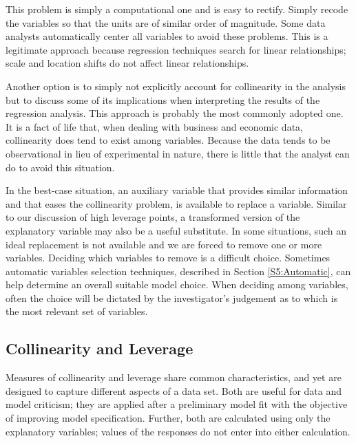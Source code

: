 This problem is simply a computational one and is easy to rectify. Simply
recode the variables so that the units are of similar order of magnitude.
Some data analysts automatically center all variables to avoid these
problems. This is a legitimate approach because regression techniques search
for linear relationships; scale and location shifts do not affect linear
relationships.

Another option is to simply not explicitly account for collinearity in the
analysis but to discuss some of its implications when interpreting the
results of the regression analysis. This approach is probably the most
commonly adopted one. It is a fact of life that, when dealing with business
and economic data, collinearity does tend to exist among variables. Because
the data tends to be observational in lieu of experimental in nature, there
is little that the analyst can do to avoid this situation.


In the best-case situation, an auxiliary variable that provides
similar information and that eases the collinearity problem, is
available to replace a variable. Similar to our discussion of high
leverage points, a transformed version of the explanatory variable
may also be a useful substitute. In some situations, such an ideal
replacement is not available and we are forced to remove one or more
variables. Deciding which variables to remove is a difficult choice.
Sometimes automatic variables selection techniques, described in
Section \ref{S5:Automatic}, can help determine an overall suitable
model choice. When deciding among variables, often the choice will
be dictated by the investigator's judgement as to which is the most
relevant set of variables.

\subsection{Collinearity and Leverage}

Measures of collinearity and leverage share common characteristics, and yet
are designed to capture different aspects of a data set. Both are useful for
data and model criticism; they are applied after a preliminary model fit
with the objective of improving model specification. Further, both are
calculated using only the explanatory variables; values of the responses do
not enter into either calculation.


